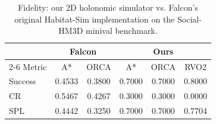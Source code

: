 \documentclass[letterpaper]{article} %
\begin{document}
\begin{table}[!ht]
    \centering
    \begin{tabular}{|l|cc|ccc|}
        \hline
        & \multicolumn{2}{c|}{Falcon} & \multicolumn{3}{c|}{Ours} \\ \cline{2-6}
        Metric & A* & ORCA & A* & ORCA & RVO2 \\ \hline
        Success & 0.4533 & 0.3800 & 0.7000 & 0.7000 & 0.8000 \\ \hline
        CR & 0.5467 & 0.4267 & 0.3000 & 0.3000 & 0.0000 \\ \hline
        SPL & 0.4442 & 0.3250 & 0.7000 & 0.7000 & 0.7704 \\ \hline
    \end{tabular}
    \caption{Fidelity: our 2D holonomic simulator vs. Falcon's original Habitat-Sim implementation on the Social-HM3D minival benchmark.}
    \label{tab:fidelity}
\end{table}




% 
\end{document}

